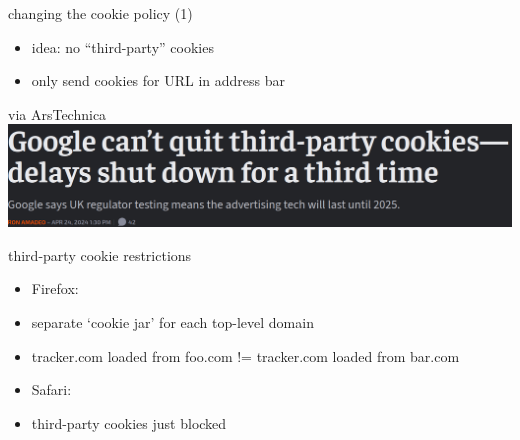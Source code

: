 
\begin{frame}{changing the cookie policy (1)}
    \begin{itemize}
    \item idea: no ``third-party'' cookies
    \item only send cookies for URL in address bar
    \end{itemize}
\end{frame}

\begin{frame}{via ArsTechnica}
\includegraphics[width=\textwidth]{../web/arstech-3rd-party-cookie}
\end{frame}

\begin{frame}{third-party cookie restrictions}
    \begin{itemize}
    \item Firefox:
    \vspace{.5cm}
    \item separate `cookie jar' for each top-level domain
    \item tracker.com loaded from foo.com != tracker.com loaded from bar.com
    \vspace{.5cm}
    \item Safari:
    \item third-party cookies just blocked
    \end{itemize}
\end{frame}


